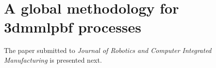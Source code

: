 
%

\chapter{A global methodology for \gls{3dmmlpbf} processes}%
\label{ch:annex-article}
The paper submitted to \emph{Journal of Robotics and Computer Integrated
  Manufacturing} is presented next.



